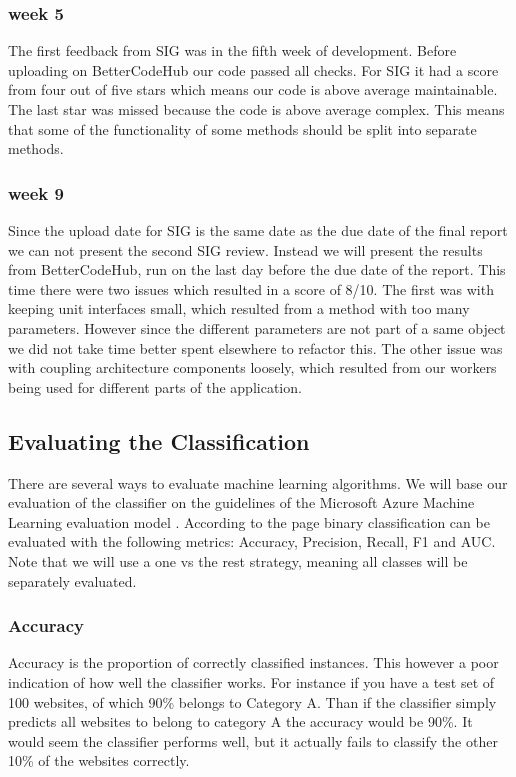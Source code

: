 \subsubsection{week 5}
The first feedback from SIG was in the fifth week of development. Before uploading on BetterCodeHub our code passed all checks. For SIG it had a score from four out of five stars which means our code is above average maintainable. The last star was missed because the code is above average complex. This means that some of the functionality of some methods should be split into separate methods.

\subsubsection{week 9}
Since the upload date for SIG is the same date as the due date of the final report we can not present the second SIG review. Instead we will present the results from BetterCodeHub, run on the last day before the due date of the report. This time there were two issues which resulted in a score of 8/10. The first was with keeping unit interfaces small, which resulted from a method with too many parameters. However since the different parameters are not part of a same object we did not take time better spent elsewhere to refactor this. The other issue was with coupling architecture components loosely, which resulted from our workers being used for different parts of the application.

\subsection{Evaluating the Classification}
There are several ways to evaluate machine learning algorithms. We will base our evaluation of the classifier on the guidelines of the Microsoft Azure Machine Learning evaluation model \cite{EvualteML}. According to the page binary classification can be evaluated with the following metrics: Accuracy, Precision, Recall, F1 and AUC. Note that we will use a one vs the rest strategy, meaning all classes will be separately evaluated.

\subsubsection{Accuracy}
Accuracy is the proportion of correctly classified instances. This however a poor indication of how well the classifier works. For instance if you have a test set of 100 websites, of which 90\% belongs to Category A. Than if the classifier simply predicts all websites to belong to category A the accuracy would be 90\%. It would seem the classifier performs well, but it actually fails to classify the other 10\% of the websites correctly.

